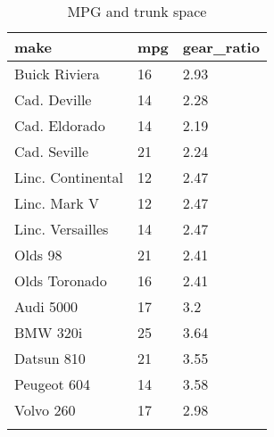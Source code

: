\documentclass{article}
\begin{document}
\begin{table}[tbp] \centering%
\caption{MPG and trunk space}%
\begin{tabularx}{\textwidth}{lCC}
\toprule
make&mpg&gear\_ratio \tabularnewline
\midrule\addlinespace[1.5ex]
Buick Riviera&16&2.93 \tabularnewline
Cad. Deville&14&2.28 \tabularnewline
Cad. Eldorado&14&2.19 \tabularnewline
Cad. Seville&21&2.24 \tabularnewline
Linc. Continental&12&2.47 \tabularnewline
Linc. Mark V&12&2.47 \tabularnewline
Linc. Versailles&14&2.47 \tabularnewline
Olds 98&21&2.41 \tabularnewline
Olds Toronado&16&2.41 \tabularnewline
Audi 5000&17&3.2 \tabularnewline
BMW 320i&25&3.64 \tabularnewline
Datsun 810&21&3.55 \tabularnewline
Peugeot 604&14&3.58 \tabularnewline
Volvo 260&17&2.98 \tabularnewline
\bottomrule \addlinespace[1.5ex]
\end{tabularx}%
\end{table}%
\end{document}

